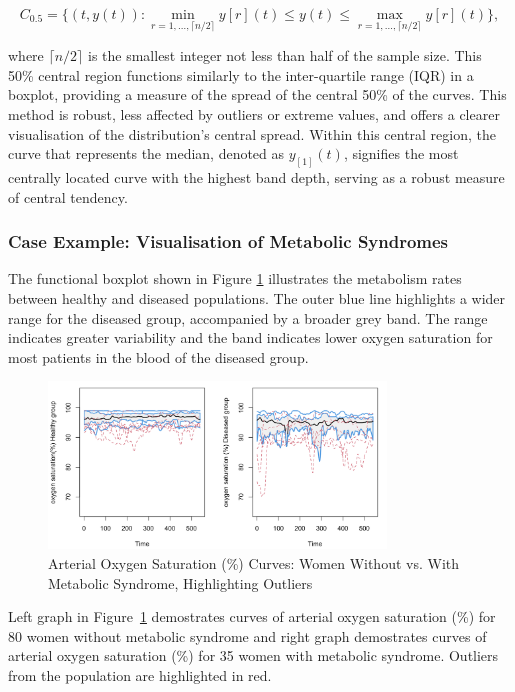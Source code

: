 \documentclass{article}\usepackage[]{graphicx}\usepackage[]{xcolor}
\numberwithin{equation}{section}
\begin{document}
\begin{equation}
C_{0.5} = \{(t, y(t)) : \min_{r=1, \ldots, \lceil n/2 \rceil} y[r](t) \leq y(t) \leq \max_{r=1, \ldots, \lceil n/2 \rceil} y[r](t)\},
\end{equation}

\noindent
where $\lceil n/2 \rceil$ is the smallest integer not less than half of the sample size. This 50\% central region functions similarly to the inter-quartile range (IQR) in a boxplot, providing a measure of the spread of the central 50\% of the curves. This method is robust, less affected by outliers or extreme values, and offers a clearer visualisation of the distribution's central spread. Within this central region, the curve that represents the median, denoted as $y_{[1]}(t)$, signifies the most centrally located curve with the highest band depth, serving as a robust measure of central tendency.

\subsubsection{Case Example: Visualisation of Metabolic Syndromes}
\noindent
The functional boxplot shown in Figure \ref{fig:fbplot} illustrates the metabolism rates between healthy and diseased populations. The outer blue line highlights a wider range for the diseased group, accompanied by a broader grey band. The range indicates greater variability and the band indicates lower oxygen saturation for most patients in the blood of the diseased group.
\begin{figure}[H]
    \centering
    \includegraphics[width=0.8\textwidth]{image_reference/fbplot.png}
    \caption{Arterial Oxygen Saturation (\%) Curves: Women Without vs. With Metabolic Syndrome, Highlighting Outliers}
    \label{fig:fbplot}
\end{figure}

\noindent Left graph in Figure~\ref{fig:fbplot} demostrates curves of arterial oxygen saturation (\%) for 80 women without metabolic syndrome and right graph demostrates curves of arterial oxygen saturation (\%) for 35 women with metabolic syndrome. Outliers from the population are highlighted in red.
\end{document}
